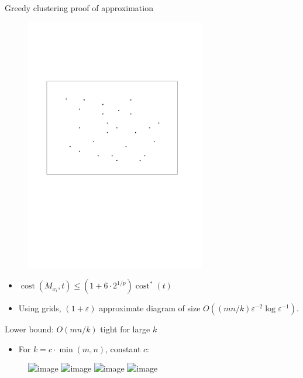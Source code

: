 \documentclass[xcolor={dvipsnames,usenames}]{beamer}
\newcommand{\eps}{\varepsilon}
\DeclareMathOperator{\cost}{cost}
\begin{document}
\begin{frame}{Greedy clustering proof of approximation}
\begin{figure}
\begin{center}
\includegraphics[width=0.7\textwidth,page=4]{cluster_proof}%
\end{center}
\end{figure}
\begin{itemize}
\item $\cost(M_{x_i}, t) \leq (1+6\cdot 2^{1/p}) \cost^*(t)$
\item Using grids, $(1+\eps)$ approximate diagram of size
	$O((mn/k) \eps^{-2}\log \eps^{-1})$.
\end{itemize}
\end{frame}

\begin{frame}{Lower bound: $O(mn/k)$ tight for large $k$}
\begin{itemize}
\item For $k = c\cdot\min(m, n)$, constant $c$:
\end{itemize}
\begin{figure}
\begin{center}
\includegraphics<1>[width=0.7\textwidth,page=1]{lower_bound_big_k}%
\includegraphics<2>[width=0.7\textwidth,page=2]{lower_bound_big_k}%
\includegraphics<3>[width=0.7\textwidth,page=3]{lower_bound_big_k}%
\includegraphics<4->[width=0.7\textwidth,page=4]{lower_bound_big_k}%
\end{center}
\end{figure}
\end{frame}
\end{document}
